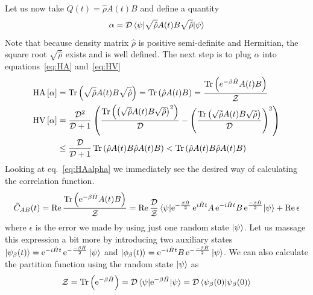 Let us now take \(Q(t) = \hat{\rho}A(t)B\)
and define a quantity
\begin{equation}
	\alpha = \dimension \matrixel{\psi}{\sqrt{\hat{\rho}}A(t)B\sqrt{\hat{\rho}}}{\psi}
\end{equation}
Note that because density matrix \(\hat{\rho}\) is positive semi-definite and Hermitian, the
square root \(\sqrt{\hat{\rho}}\) exists and is well defined. The next step is to plug \(\alpha\)
into equations~\eqref{eq:HA} and~\eqref{eq:HV}
\begin{align}
	\mathrm{HA}\left[\alpha\right] & = \Tr\left(\sqrt{\hat{\rho}}A(t)B\sqrt{\hat{\rho}}\right) = \Tr\left(\hat{\rho}A(t)B\right) = \frac{\Tr\left(e^{-\beta \hat{H} }A(t)B\right)}{\mathcal{Z}} \label{eq:HAalpha} \\
	\mathrm{HV}\left[\alpha\right] & = \frac{\mathcal{D}^2}{\mathcal{D} + 1}\left(
	\frac{\Tr\left(\left(\sqrt{\hat{\rho}}A(t)B\sqrt{\hat{\rho}}\right)^2\right)}{\mathcal{D}} - \left(\frac{\Tr\left(\sqrt{\hat{\rho}}A(t)B\sqrt{\hat{\rho}}\right)}{\mathcal{D}}\right)^2
	\right) \nonumber                                                                                                                                                                                       \\
	                               & \leq \frac{\mathcal{D}}{\mathcal{D}+1} \Tr\left(\hat{\rho}A(t)B \hat{\rho}A(t)B\right) < \Tr\left(\hat{\rho}A(t)B \hat{\rho}A(t)B\right)
	\label{eq:HValpha}
\end{align}
Looking at eq.~\eqref{eq:HAalpha} we immediately see the desired way of calculating the correlation function.
\begin{equation}
	\tilde{C}_{AB}(t) = \Re \frac{\Tr\left(\mathrm{e}^{-\beta \hat{H} }A(t)B\right)}{\mathcal{Z}} = \Re \frac{\dimension}{\mathcal{Z}}
	\matrixel{\psi}{\mathrm{e}^{-\frac{\beta \hat{H} }{2}}\,\mathrm{e}^{i \hat{H}  t}A \,\mathrm{e}^{-i \hat{H}  t} B\,\mathrm{e}^{\frac{-\beta \hat{H} }{2}}}{\psi} + \Re \epsilon
	\label{eq:corr_dqt}
\end{equation}
where \(\epsilon\) is the error we made by using just one random state \(\ket{\psi}\).
Let us massage this expression a bit more by introducing two auxiliary states
\(\ket{\psi_{\beta}(t)} = \mathrm{e}^{-i \hat{H} t }\, \mathrm{e}^{-\frac{-\beta \hat{H} }{2}} \ket{\psi} \) and
\(\ket{\phi_{\beta}(t)} = \mathrm{e}^{-i \hat{H} t } B \,\mathrm{e}^{-\frac{-\beta \hat{H} }{2}} \ket{\psi} \). We can also
calculate the partition function using the random state \(\ket{\psi}\) as
\begin{equation}
	\mathcal{Z} = \Tr\left(\mathrm{e}^{-\beta \hat{H} }\right) = \dimension \matrixel{\psi}{\mathrm{e}^{-\beta \hat{H} }}{\psi} =
	\dimension \braket{\psi_{\beta}(0)}{\psi_{\beta}(0)}
	\label{eq:partition_dqt}
\end{equation}
